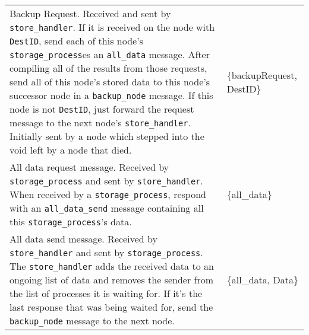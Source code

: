 \documentclass[12pt,letterpaper]{article}
\renewcommand{\tt}[1]{\texttt{#1}}
\newcommand{\sh}{\tt{store\_handler}}
\renewcommand{\sp}{\tt{storage\_process}}
\begin{document}
\begin{longtable}{p{4.5in}T}
Backup Request.  Received and sent by \sh.  If it is received on the node with \tt{DestID}, send each of this node's \sp es an \tt{all\_data} message.  After compiling all of the results from those requests, send all of this node's stored data to this node's successor node in a \tt{backup\_node} message.  If this node is not \tt{DestID}, just forward the request message to the next node's \sh. Initially sent by a node which stepped into the void left by a node that died.  & 
\{backupRequest, DestID\} \\

All data request message.  Received by \sp{} and sent by \sh.  When received by a \sp, respond with an \tt{all\_data\_send} message containing all this \sp's data.  & 
\{all\_data\} \\

All data send message.  Received by \sh{} and sent by \sp.  The \sh{} adds the received data to an ongoing list of data and removes the sender from the list of processes it is waiting for. If it's the last response that was being waited for, send the \tt{backup\_node} message to the next node. & 
\{all\_data, Data\}

\end{longtable}

\clearpage
\onehalfspacing
\end{document}
